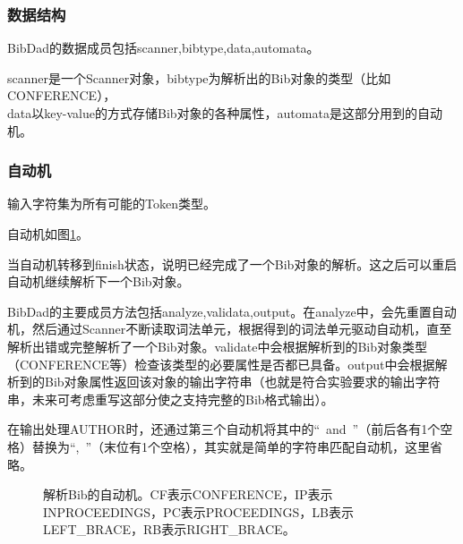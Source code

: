 \documentclass[a4paper]{article}
\begin{document}
\begin{CJK*}{UTF8}{gbsn}
    \subsubsection{数据结构}
    BibDad的数据成员包括scanner,bibtype,data,automata。
    \par scanner是一个Scanner对象，bibtype为解析出的Bib对象的类型（比如CONFERENCE），\\data以key-value的方式存储Bib对象的各种属性，automata是这部分用到的自动机。

    \subsubsection{自动机}
    输入字符集为所有可能的Token类型。
    \par 自动机如图\ref{fig:automata2}。
    \par 当自动机转移到finish状态，说明已经完成了一个Bib对象的解析。这之后可以重启自动机继续解析下一个Bib对象。
    \par BibDad的主要成员方法包括analyze,validata,output。在analyze中，会先重置自动机，然后通过Scanner不断读取词法单元，根据得到的词法单元驱动自动机，直至解析出错或完整解析了一个Bib对象。validate中会根据解析到的Bib对象类型（CONFERENCE等）检查该类型的必要属性是否都已具备。output中会根据解析到的Bib对象属性返回该对象的输出字符串（也就是符合实验要求的输出字符串，未来可考虑重写这部分使之支持完整的Bib格式输出）。
    \par 在输出处理AUTHOR时，还通过第三个自动机将其中的“~and~”（前后各有1个空格）替换为“,~”（末位有1个空格），其实就是简单的字符串匹配自动机，这里省略。

    \begin{figure}
        \caption{解析Bib的自动机。CF表示CONFERENCE，IP表示INPROCEEDINGS，PC表示PROCEEDINGS，LB表示LEFT\_BRACE，RB表示RIGHT\_BRACE。}
        \label{fig:automata2}
    \end{figure}


\end{CJK*}
\end{document}
